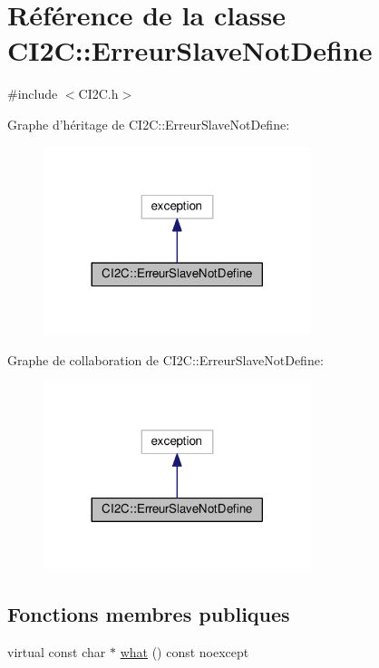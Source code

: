 \hypertarget{class_c_i2_c_1_1_erreur_slave_not_define}{\section{Référence de la classe C\+I2\+C\+:\+:Erreur\+Slave\+Not\+Define}
\label{class_c_i2_c_1_1_erreur_slave_not_define}
}


{\ttfamily \#include $<$C\+I2\+C.\+h$>$}



Graphe d'héritage de C\+I2\+C\+:\+:Erreur\+Slave\+Not\+Define\+:
\nopagebreak
\begin{figure}[H]
\begin{center}
\leavevmode
\includegraphics[width=221pt]{class_c_i2_c_1_1_erreur_slave_not_define__inherit__graph}
\end{center}
\end{figure}


Graphe de collaboration de C\+I2\+C\+:\+:Erreur\+Slave\+Not\+Define\+:
\nopagebreak
\begin{figure}[H]
\begin{center}
\leavevmode
\includegraphics[width=221pt]{class_c_i2_c_1_1_erreur_slave_not_define__coll__graph}
\end{center}
\end{figure}
\subsection*{Fonctions membres publiques}
\begin{DoxyCompactItemize}
\item 
virtual const char $\ast$ \hyperlink{class_c_i2_c_1_1_erreur_slave_not_define_a7efd5525f6598a091e21519cfcc3cd95}{what} () const noexcept
\end{DoxyCompactItemize}


